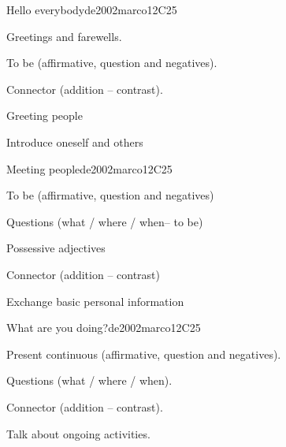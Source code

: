 \begin{syllabus}
\begin{unit}{Hello everybody}{}{de2002marco}{12}{C25}
   \begin{topics}
      \item Greetings and farewells.
      \item To be (affirmative, question and negatives).
      \item Connector (addition – contrast).
   \end{topics}

   \begin{learningoutcomes}
      \item Greeting people
      \item Introduce oneself and others
   \end{learningoutcomes}
\end{unit}

\begin{unit}{Meeting people}{}{de2002marco}{12}{C25}
   \begin{topics}
      \item To be (affirmative, question and negatives)
      \item Questions (what / where / when– to be)
      \item Possessive adjectives
      \item Connector (addition – contrast)
   \end{topics}

   \begin{learningoutcomes}
      \item Exchange basic personal information  
   \end{learningoutcomes}

\end{unit}

\begin{unit}{What are you doing?}{}{de2002marco}{12}{C25}
   \begin{topics}
      \item Present continuous (affirmative, question and negatives).
      \item Questions (what / where / when).
      \item Connector (addition – contrast).
   \end{topics}

   \begin{learningoutcomes}
      \item Talk about ongoing activities.
   \end{learningoutcomes}


\end{unit}
\end{syllabus}
